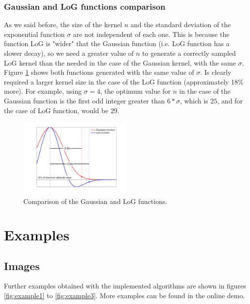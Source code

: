 \documentclass{ipol}
\numberwithin{equation}{section}
\numberwithin{table}{section}
\numberwithin{figure}{section}
\begin{document}
\subsubsection{Gaussian and LoG functions comparison}

As we said before, the size of the kernel $n$ and the standard deviation of the exponential function 
$\sigma$ are not independent of each one. This is because the function LoG is "wider" that the 
Gaussian function (i.e. LoG function has a slower decay), so we need a greater value of $n$ to 
generate a correctly sampled LoG kernel than the needed in the case of the Gaussian kernel, with the same $\sigma$.\\

Figure \ref{fig:kernels} shows both functions generated with the same value of $\sigma$. Is clearly 
required a larger kernel size in the case of the LoG function (approximately 18\% more). For 
example, using $\sigma=4$, the optimum value for $n$ in the case of the Gaussian function is the 
first odd integer greater than $6*\sigma$, which is $25$, and for the case of LoG function, would 
be $29$.\\

\begin{figure}
	\centering
	\includegraphics[width=0.5\textwidth]{kernels.pdf}
	\caption{Comparison of the Gaussian and LoG functions.}
	\label{fig:kernels}
\end{figure}

\clearpage
\section{Examples}
\label{sec:examples}

\subsection{Images}

Further examples obtained with the implemented algorithms are shown in figures \ref{fig:example1} to \ref{fig:example3}. More examples can be found in the online demo. \\
\end{document}

